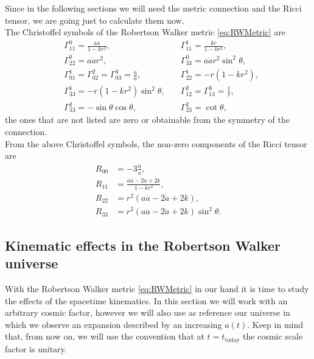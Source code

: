 Since in the following sections we will need the metric connection and the Ricci tensor, we are going just to calculate them now.\\
The Christoffel symbols of the Robertson Walker metric \eqref{eq:RWMetric} are
\begin{align}
    &\Gamma^0_{11}=\frac{a\dot{a}}{1-kr^2}, \quad&\Gamma^1_{11}=\frac{kr}{1-kr^2},\nonumber\\&\Gamma^0_{22}=a\dot{a}r^2, \quad&\Gamma^0_{33}=a\dot{a}r^2\sin^2\theta,\nonumber\\&\Gamma^1_{01}=\Gamma^2_{02}=\Gamma^3_{03}=\frac{\dot{a}}{a}, \quad &\Gamma^1_{22}=-r(1-kr^2),\nonumber\\&\Gamma^1_{33}=-r(1-kr^2)\sin^2\theta, \quad &\Gamma^2_{12}=\Gamma^3_{13}=\frac{1}{r},\nonumber\\&\Gamma^2_{33}=-\sin\theta\cos\theta, \quad &\Gamma^2_{23}=\cot\theta,\label{eq:RWChristoffel}
\end{align}
the ones that are not listed are zero or obtainable from the symmetry of the connection.\\
From the above Christoffel symbols, the non-zero components of the Ricci tensor are
\begin{align}
    R_{00}&=-3\frac{\ddot a}{a},\nonumber\\
    R_{11}&=\frac{a\ddot{a}-2\dot a+2k}{1-kr^2},\nonumber\\
    R_{22}&=r^2(a\ddot{a}-2\dot a+2k),\nonumber\\
    R_{33}&=r^2(a\ddot{a}-2\dot a+2k)\sin^2\theta.\label{eq:RWRicci}
\end{align}
\subsection{Kinematic effects in the Robertson Walker universe}
With the Robertson Walker metric \eqref{eq:RWMetric} in our hand it is time to study the effects of the spacetime kinematics. In this section we will work with an arbitrary cosmic factor, however we will also use as reference our universe in which we observe an expansion described by an increasing $a(t)$. Keep in mind that, from now on, we will use the convention that at $t=t_\text{today}$ the cosmic scale factor is unitary.
